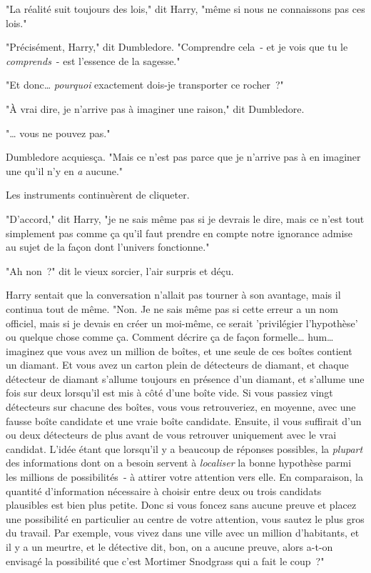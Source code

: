 "La réalité suit toujours des lois," dit Harry, "même si nous ne connaissons pas ces lois."

"Précisément, Harry," dit Dumbledore. "Comprendre cela~- et je vois que tu le \emph{comprends}~- est l'essence de la sagesse."

"Et donc… \emph{pourquoi} exactement dois-je transporter ce rocher~?"

"À vrai dire, je n'arrive pas à imaginer une raison," dit Dumbledore.

"… vous ne pouvez pas."

Dumbledore acquiesça. "Mais ce n'est pas parce que je n'arrive pas à en imaginer une qu'il n'y en \emph{a} aucune."

Les instruments continuèrent de cliqueter.

"D'accord," dit Harry, "je ne sais même pas si je devrais le dire, mais ce n'est tout simplement pas comme ça qu'il faut prendre en compte notre ignorance admise au sujet de la façon dont l'univers fonctionne."

"Ah non~?" dit le vieux sorcier, l'air surpris et déçu.

Harry sentait que la conversation n'allait pas tourner à son avantage, mais il continua tout de même. "Non. Je ne sais même pas si cette erreur a un nom officiel, mais si je devais en créer un moi-même, ce serait 'privilégier l'hypothèse' ou quelque chose comme ça. Comment décrire ça de façon formelle… hum… imaginez que vous avez un million de boîtes, et une seule de ces boîtes contient un diamant. Et vous avez un carton plein de détecteurs de diamant, et chaque détecteur de diamant s'allume toujours en présence d'un diamant, et s'allume une fois sur deux lorsqu'il est mis à côté d'une boîte vide. Si vous passiez vingt détecteurs sur chacune des boîtes, vous vous retrouveriez, en moyenne, avec une fausse boîte candidate et une vraie boîte candidate. Ensuite, il vous suffirait d'un ou deux détecteurs de plus avant de vous retrouver uniquement avec le vrai candidat. L'idée étant que lorsqu'il y a beaucoup de réponses possibles, la \emph{plupart} des informations dont on a besoin servent à \emph{localiser} la bonne hypothèse parmi les millions de possibilités~- à attirer votre attention vers elle. En comparaison, la quantité d'information nécessaire à choisir entre deux ou trois candidats plausibles est bien plus petite. Donc si vous foncez sans aucune preuve et placez une possibilité en particulier au centre de votre attention, vous sautez le plus gros du travail. Par exemple, vous vivez dans une ville avec un million d'habitants, et il y a un meurtre, et le détective dit, bon, on a aucune preuve, alors a-t-on envisagé la possibilité que c'est Mortimer Snodgrass qui a fait le coup~?"

